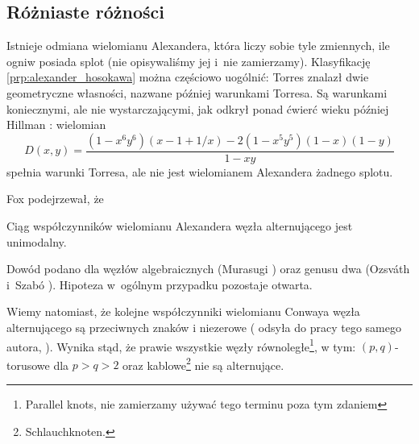 
\subsection{Różniaste różności}
Istnieje odmiana wielomianu Alexandera, która liczy sobie tyle zmiennych, ile ogniw posiada splot (nie opisywaliśmy jej i~nie zamierzamy).
Klasyfikację \ref{prp:alexander_hosokawa} można częściowo uogólnić: Torres \cite{torres53} znalazł dwie geometryczne własności, nazwane później warunkami Torresa.
%
%
Są warunkami koniecznymi, ale nie wystarczającymi, jak odkrył ponad ćwierć wieku później Hillman \cite{hillman81}: wielomian
%
\begin{equation}
    D(x,y) = \frac{(1 - x^6y^6)(x - 1 + 1/x) - 2(1 - x^5y^5)(1 - x)(1 - y)}{1-xy}
\end{equation}
spełnia warunki Torresa, ale nie jest wielomianem Alexandera żadnego splotu.

Fox \cite{fox62} podejrzewał, że
%
\begin{conjecture}
%
    Ciąg współczynników wielomianu Alexandera węzła alternującego jest unimodalny.
\end{conjecture}
Dowód podano dla węzłów algebraicznych (Murasugi \cite{murasugi85}) oraz genusu dwa (Ozsváth i~Szabó \cite{ozsvath03}).
%
%
%
Hipoteza w~ogólnym przypadku pozostaje otwarta.

Wiemy natomiast, że kolejne współczynniki wielomianu Conwaya węzła alternującego są przeciwnych znaków i niezerowe (\cite[s. 242]{murasugi96} odsyła do pracy tego samego autora, \cite{murasugi59}).
Wynika stąd, że prawie wszystkie węzły równoległe\footnote{Parallel knots, nie zamierzamy używać tego terminu poza tym zdaniem}, w tym: $(p, q)$-torusowe dla $p > q > 2$ oraz kablowe\footnote{Schlauchknoten.} nie są alternujące.


